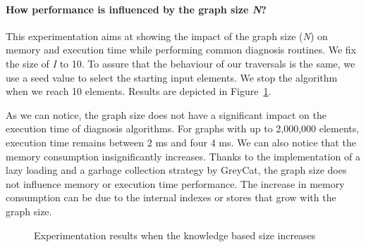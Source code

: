 \paragraph{How performance is influenced by the graph size \textit{N}?}
This experimentation aims at showing the impact of the graph size (\textit{N}) on memory and execution time while performing common diagnosis routines.
We fix the size of \textit{I} to 10. To assure that the behaviour of our traversals is the same, we use a seed value to select the starting input elements. We stop the algorithm when we reach 10 elements.
Results are depicted in Figure~\ref{fig:exp1}.

As we can notice, the graph size does not have a significant impact on the execution time of diagnosis algorithms.
For graphs with up to 2,000,000 elements, execution time remains between 2 ms and four 4 ms. We can also notice that the memory consumption insignificantly increases.
Thanks to the implementation of a lazy loading and a garbage collection strategy by GreyCat, the graph size does not influence memory or execution time performance. The increase in memory consumption can be due to the internal indexes or stores that grow with the graph size.

\begin{figure}
	\centering
	\hfil
	\caption{Experimentation results when the knowledge based size increases}
	\label{fig:exp1}
\end{figure}

